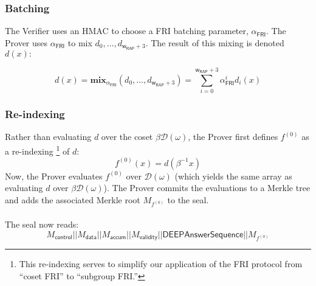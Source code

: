 \documentclass[10pt,letterpaper,titlepage]{article}
\newcommand{\w}[0]{\omega}
\newcommand{\D}[0]{\mathcal{D}}
\theoremstyle{definition}
\begin{document}
\begin{appendices}
\subsubsection*{Batching}
The Verifier uses an HMAC to choose a FRI batching parameter, $\alpha_\mathsf{FRI}$. 
The Prover uses $\alpha_\mathsf{FRI}$ to mix $d_0,\ldots,d_{\mathsf{w}_\mathsf{RAP}+3}$. The result of this mixing is denoted $d(x):$

\[d(x) = \textbf{mix}_{\alpha_\mathsf{FRI}}(d_0,\ldots,d_{\mathsf{w}_\mathsf{RAP}+3}) = \sum_{i=0}^{\mathsf{w}_\mathsf{RAP}+3}\alpha_\mathsf{FRI}^i d_i(x)\]
\subsubsection*{Re-indexing}
Rather than evaluating $d$ over the coset $\beta{\D(\w)}$, the Prover first defines $f^{(0)}$ as a re-indexing%
\footnote{This re-indexing serves to simplify our application of the FRI protocol from ``coset FRI'' to ``subgroup FRI.''} of $d$:
\[f^{(0)}(x)=d(\beta^{-1}x)\]
Now, the Prover evaluates $f^{(0)}$ over $\D(\w)$ (which yields the same array as evaluating $d$ over $\beta{\D(\w)}$). 
The Prover commits the evaluations to a Merkle tree and adds the associated Merkle root $M_{f^{(0)}}$ to the seal. \\
\\
The seal now reads:
\[M_\mathsf{control}||M_\mathsf{data}||M_\mathsf{accum}||M_\mathsf{validity}||\mathsf{DEEPAnswerSequence}||M_{f^{(0)}}\]


\end{appendices}
\end{document}
